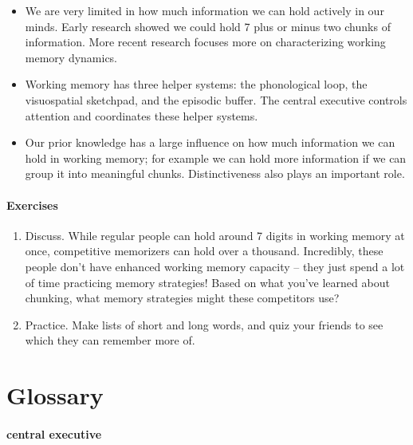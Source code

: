 \documentclass[
]{krantz}
\providecommand{\tightlist}{%
  \setlength{\itemsep}{0pt}\setlength{\parskip}{0pt}}
\begin{document}
\begin{itemize}
\tightlist
\item
  We are very limited in how much information we can hold actively in our minds. Early research showed we could hold 7 plus or minus two chunks of information. More recent research focuses more on characterizing working memory dynamics.
\item
  Working memory has three helper systems: the phonological loop, the visuospatial sketchpad, and the episodic buffer. The central executive controls attention and coordinates these helper systems.
\item
  Our prior knowledge has a large influence on how much information we can hold in working memory; for example we can hold more information if we can group it into meaningful chunks. Distinctiveness also plays an important role.
\end{itemize}

\hypertarget{exercises-3}{%
\paragraph*{Exercises}\label{exercises-3}}

\begin{enumerate}
\def\labelenumi{\arabic{enumi}.}
\tightlist
\item
  Discuss. While regular people can hold around 7 digits in working memory at once, competitive memorizers can hold over a thousand. Incredibly, these people don't have enhanced working memory capacity -- they just spend a lot of time practicing memory strategies! Based on what you've learned about chunking, what memory strategies might these competitors use?
\item
  Practice. Make lists of short and long words, and quiz your friends to see which they can remember more of.
\end{enumerate}

\hypertarget{glossary-3}{%
\section{Glossary}\label{glossary-3}}

\hypertarget{central-executive}{%
\paragraph*{central executive}\label{central-executive}}
\end{document}
